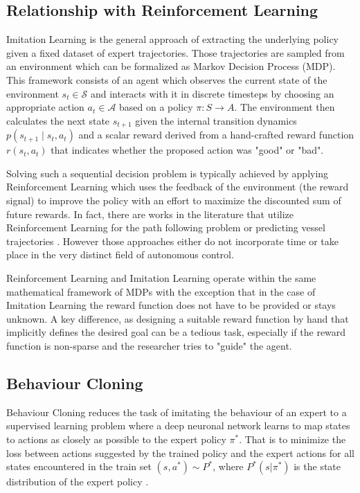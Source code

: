 \documentclass[conference]{IEEEtran}
\begin{document}
\subsection{Relationship with Reinforcement Learning}
Imitation Learning is the general approach of extracting the underlying policy given a fixed dataset of expert trajectories. Those trajectories are sampled from an environment which can be  formalized as Markov Decision Process (MDP). This framework consists of an agent which observes the current state of the environment $s_t \in \mathcal{S}$ and interacts with it in discrete timesteps by choosing an appropriate action $a_t \in \mathcal{A}$ based on a policy $\pi: S \rightarrow A$. The environment then calculates the next state $s_{t+1}$ given the internal transition dynamics $p(s_{t+1} \mid s_t, a_t)$  and a scalar reward derived from a hand-crafted reward function $r(s_t, a_t)$ that indicates whether the proposed action was "good" or "bad".
\par
Solving such a sequential decision problem is typically achieved by applying Reinforcement Learning which uses the feedback of the environment (the reward signal) to improve the policy with an effort to maximize the discounted sum of future rewards. In fact, there are works in the literature that utilize Reinforcement Learning for the path following problem \cite{martinsen2018curved} or predicting vessel trajectories \cite{etemad2020using, zare2021continuous, s20020426, westerlund2021learning}. However those approaches either do not incorporate time or take place in the very distinct field of autonomous control. 
\par
Reinforcement Learning and Imitation Learning operate within the same mathematical framework of MDPs with the exception that in the case of Imitation Learning the reward function does not have to be provided or stays unknown. A key difference, as designing a suitable reward function by hand that implicitly defines the desired goal can be a tedious task, especially if the reward function is non-sparse and the researcher tries to "guide" the agent.

\subsection{Behaviour Cloning}
Behaviour Cloning\cite{alvinn} reduces the task of imitating the behaviour of an expert to a supervised learning problem where a deep neuronal network learns to map states to actions as closely as possible to the expert policy $\pi^*$. That is to minimize the loss between actions suggested by the trained policy and the expert actions for all states encountered in the train set $(s, a^*) \sim P^*$, where $P^*(s|\pi^*)$ is the state distribution of the expert policy \cite{le2022survey}.
\end{document}
